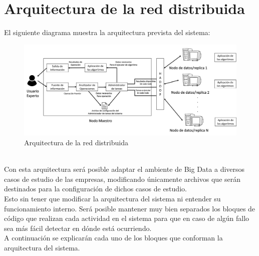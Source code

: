 \section{Arquitectura de la red distribuida}
El siguiente diagrama muestra la arquitectura prevista del sistema:
\begin{figure}[!htbp]
	\hypertarget{fig:cap1}{\hspace{1pt}}
	\begin{center}
		\includegraphics[height=0.3\textheight]{capitulo1/images/im1.png}
		\caption{Arquitectura de la red distribuida}
		\label{fig:cap1}
	\end{center}
\end{figure}
\\ 
Con esta arquitectura será posible adaptar el ambiente de Big Data a diversos casos de estudio de las empresas, modificando únicamente archivos que serán destinados para la configuración de dichos
casos de estudio. 
\\
Esto sin tener que modificar la arquitectura del sistema ni entender su funcionamiento interno. Será posible
mantener muy bien separados los bloques de código que realizan cada actividad en el sistema para que en caso de algún fallo sea
más fácil detectar en dónde está ocurriendo.
\\
A continuación se explicarán cada uno de los bloques que conforman la arquitectura del sistema.
